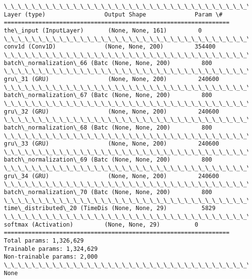 \documentclass[11pt]{article}
\begin{document}
    \begin{Verbatim}[commandchars=\\\{\}]
\_\_\_\_\_\_\_\_\_\_\_\_\_\_\_\_\_\_\_\_\_\_\_\_\_\_\_\_\_\_\_\_\_\_\_\_\_\_\_\_\_\_\_\_\_\_\_\_\_\_\_\_\_\_\_\_\_\_\_\_\_\_\_\_\_
Layer (type)                 Output Shape              Param \#   
=================================================================
the\_input (InputLayer)       (None, None, 161)         0         
\_\_\_\_\_\_\_\_\_\_\_\_\_\_\_\_\_\_\_\_\_\_\_\_\_\_\_\_\_\_\_\_\_\_\_\_\_\_\_\_\_\_\_\_\_\_\_\_\_\_\_\_\_\_\_\_\_\_\_\_\_\_\_\_\_
conv1d (Conv1D)              (None, None, 200)         354400    
\_\_\_\_\_\_\_\_\_\_\_\_\_\_\_\_\_\_\_\_\_\_\_\_\_\_\_\_\_\_\_\_\_\_\_\_\_\_\_\_\_\_\_\_\_\_\_\_\_\_\_\_\_\_\_\_\_\_\_\_\_\_\_\_\_
batch\_normalization\_66 (Batc (None, None, 200)         800       
\_\_\_\_\_\_\_\_\_\_\_\_\_\_\_\_\_\_\_\_\_\_\_\_\_\_\_\_\_\_\_\_\_\_\_\_\_\_\_\_\_\_\_\_\_\_\_\_\_\_\_\_\_\_\_\_\_\_\_\_\_\_\_\_\_
gru\_31 (GRU)                 (None, None, 200)         240600    
\_\_\_\_\_\_\_\_\_\_\_\_\_\_\_\_\_\_\_\_\_\_\_\_\_\_\_\_\_\_\_\_\_\_\_\_\_\_\_\_\_\_\_\_\_\_\_\_\_\_\_\_\_\_\_\_\_\_\_\_\_\_\_\_\_
batch\_normalization\_67 (Batc (None, None, 200)         800       
\_\_\_\_\_\_\_\_\_\_\_\_\_\_\_\_\_\_\_\_\_\_\_\_\_\_\_\_\_\_\_\_\_\_\_\_\_\_\_\_\_\_\_\_\_\_\_\_\_\_\_\_\_\_\_\_\_\_\_\_\_\_\_\_\_
gru\_32 (GRU)                 (None, None, 200)         240600    
\_\_\_\_\_\_\_\_\_\_\_\_\_\_\_\_\_\_\_\_\_\_\_\_\_\_\_\_\_\_\_\_\_\_\_\_\_\_\_\_\_\_\_\_\_\_\_\_\_\_\_\_\_\_\_\_\_\_\_\_\_\_\_\_\_
batch\_normalization\_68 (Batc (None, None, 200)         800       
\_\_\_\_\_\_\_\_\_\_\_\_\_\_\_\_\_\_\_\_\_\_\_\_\_\_\_\_\_\_\_\_\_\_\_\_\_\_\_\_\_\_\_\_\_\_\_\_\_\_\_\_\_\_\_\_\_\_\_\_\_\_\_\_\_
gru\_33 (GRU)                 (None, None, 200)         240600    
\_\_\_\_\_\_\_\_\_\_\_\_\_\_\_\_\_\_\_\_\_\_\_\_\_\_\_\_\_\_\_\_\_\_\_\_\_\_\_\_\_\_\_\_\_\_\_\_\_\_\_\_\_\_\_\_\_\_\_\_\_\_\_\_\_
batch\_normalization\_69 (Batc (None, None, 200)         800       
\_\_\_\_\_\_\_\_\_\_\_\_\_\_\_\_\_\_\_\_\_\_\_\_\_\_\_\_\_\_\_\_\_\_\_\_\_\_\_\_\_\_\_\_\_\_\_\_\_\_\_\_\_\_\_\_\_\_\_\_\_\_\_\_\_
gru\_34 (GRU)                 (None, None, 200)         240600    
\_\_\_\_\_\_\_\_\_\_\_\_\_\_\_\_\_\_\_\_\_\_\_\_\_\_\_\_\_\_\_\_\_\_\_\_\_\_\_\_\_\_\_\_\_\_\_\_\_\_\_\_\_\_\_\_\_\_\_\_\_\_\_\_\_
batch\_normalization\_70 (Batc (None, None, 200)         800       
\_\_\_\_\_\_\_\_\_\_\_\_\_\_\_\_\_\_\_\_\_\_\_\_\_\_\_\_\_\_\_\_\_\_\_\_\_\_\_\_\_\_\_\_\_\_\_\_\_\_\_\_\_\_\_\_\_\_\_\_\_\_\_\_\_
time\_distributed\_20 (TimeDis (None, None, 29)          5829      
\_\_\_\_\_\_\_\_\_\_\_\_\_\_\_\_\_\_\_\_\_\_\_\_\_\_\_\_\_\_\_\_\_\_\_\_\_\_\_\_\_\_\_\_\_\_\_\_\_\_\_\_\_\_\_\_\_\_\_\_\_\_\_\_\_
softmax (Activation)         (None, None, 29)          0         
=================================================================
Total params: 1,326,629
Trainable params: 1,324,629
Non-trainable params: 2,000
\_\_\_\_\_\_\_\_\_\_\_\_\_\_\_\_\_\_\_\_\_\_\_\_\_\_\_\_\_\_\_\_\_\_\_\_\_\_\_\_\_\_\_\_\_\_\_\_\_\_\_\_\_\_\_\_\_\_\_\_\_\_\_\_\_
None

    \end{Verbatim}
\end{document}
